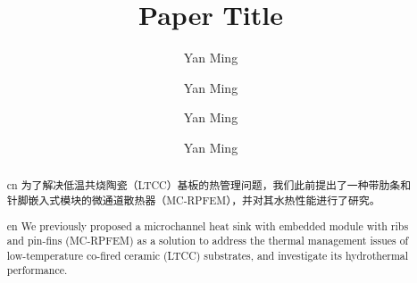 \documentclass[preprint,5p,sort&compress,times,UTF8]{elsarticle}                                             %
\newcommand{\gl}[1]{\textcolor{orange}{##1}}
\newcommand{\gl}[1]{\highLight{##1}}
\newcommand{\gl}{\CJKsout*[thickness=2.5ex,format=\color{yellow}]}                           %
\begin{document}

\begin{frontmatter}
    \title{Paper Title}                                                                                      %

    \author[rvt]{Yan Ming}
    \author[rvt]{Yan Ming}
    \author[rvt]{Yan Ming}%
    \author[rvt]{Yan Ming}%



    \begin{abstract}                                                                                          %
        \begin{taggedblock}{cn}
            为了解决低温共烧陶瓷（LTCC）基板的热管理问题，我们此前提出了一种带肋条和针脚嵌入式模块的微通道散热器（MC-RPFEM），并对其水热性能进行了研究。
        \end{taggedblock}

        \begin{taggedblock}{en}
            We previously proposed a microchannel heat sink with embedded module with ribs and pin-fins (MC-RPFEM) as a solution to address the thermal management issues of low-temperature co-fired ceramic (LTCC) substrates, and investigate its hydrothermal performance.
        \end{taggedblock}
    \end{abstract}
    


\end{frontmatter}
\end{document}
